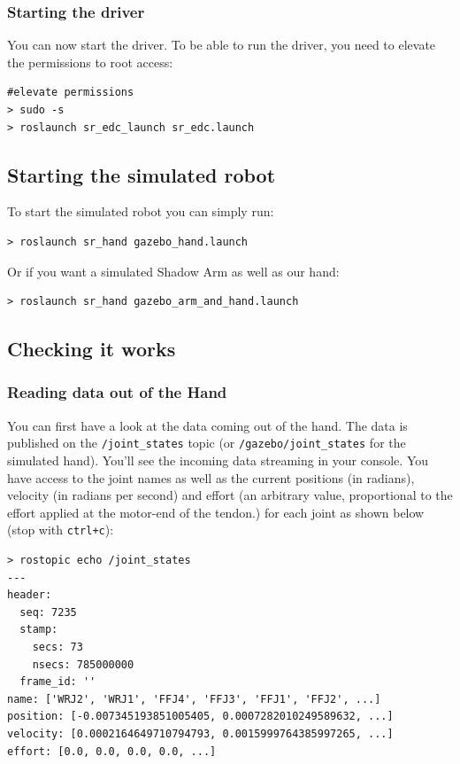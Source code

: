 \documentclass[12pt]{article}
\begin{document}
\subsubsection{Starting the driver}
\par You can now start the driver. To be able to run the driver, you need to elevate the permissions to root access:
  \begin{lstlisting}[escapeinside='']
#elevate permissions
> sudo -s
> roslaunch sr_edc_launch sr_edc.launch
  \end{lstlisting}

\subsection{Starting the simulated robot}
\label{sec:start-simul-hand}
\par To start the simulated robot you can simply run:
  \begin{lstlisting}[escapeinside='']
> roslaunch sr_hand gazebo_hand.launch
  \end{lstlisting}

\par Or if you want a simulated Shadow Arm as well as our hand:
  \begin{lstlisting}[escapeinside='']
> roslaunch sr_hand gazebo_arm_and_hand.launch
  \end{lstlisting}

\subsection{Checking it works}
\label{sec:checking-it-works}

\subsubsection{Reading data out of the Hand}
\par You can first have a look at the data coming out of the hand. The data is published on the \texttt{/joint\_states} topic (or \texttt{/gazebo/joint\_states} for the simulated hand). You'll see the incoming data streaming in your console. You have access to the joint names as well as the current positions (in radians), velocity (in radians per second) and effort (an arbitrary value, proportional to the effort applied at the motor-end of the tendon.) for each joint as shown below (stop with \texttt{ctrl+c}):
  \begin{lstlisting}[escapeinside='']
> rostopic echo /joint_states
---
header:
  seq: 7235
  stamp:
    secs: 73
    nsecs: 785000000
  frame_id: ''
name: ['WRJ2', 'WRJ1', 'FFJ4', 'FFJ3', 'FFJ1', 'FFJ2', ...]
position: [-0.007345193851005405, 0.0007282010249589632, ...]
velocity: [0.0002164649710794793, 0.0015999764385997265, ...]
effort: [0.0, 0.0, 0.0, 0.0, ...]
  \end{lstlisting}
\end{document}

